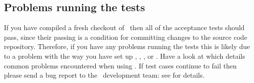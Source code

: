 \subsection{Problems running the tests}

If you have compiled a fresh checkout of \topspin\ then all of the acceptance
tests should pass, since their passing is a condition for committing
changes to the source code repository.  Therefore, if you have any problems
running the tests this is likely due to a problem with the way you have
set up \gap, \saucy, \spin, or \gcc.  Have a look at 
which details common problems encountered when using \topspin.  If test
cases continue to fail then please send a bug report to the \topspin\
development team: see  for details.

